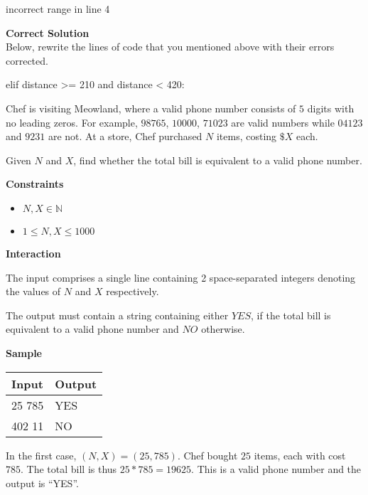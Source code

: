 \documentclass[a4paper]{exam}
\newcommand\heading[1]{\textbf{#1}}
\begin{document}
\begin{questions}
    \begin{mdframed}
    incorrect range in line 4
    \end{mdframed}

  
    \heading{Correct Solution}\\
    Below, rewrite the lines of code that you mentioned above with their errors corrected.
    
\begin{python}[numbers=none]
elif distance >= 210 and distance < 420:
\end{python}
    

    Chef is visiting Meowland, where a valid phone number consists of $5$ digits with no leading zeros. For example, $98765$, $10000$, $71023$ are valid numbers while $04123$ and $9231$ are not. At a store, Chef purchased $N$ items, costing $\$X$ each.

    Given $N$ and $X$, find whether the total bill is equivalent to a valid phone number.

    \heading{Constraints}
    \begin{itemize}
        \item $N,X \in \mathbb{N}$
        \item $1 \le N,X \le 1000$
    \end{itemize}

    \heading{Interaction}

    The input comprises a single line containing 2 space-separated integers denoting the values of $N$ and $X$ respectively.

    The output must contain a string containing either $YES$, if the total bill is equivalent to a valid phone number and $NO$ otherwise.

    \heading{Sample}

    \begin{tabularx}{\textwidth}{|X|X|}
        \rowcolor{gray!50}
        \hline
        Input  & Output \\ \hline\hline
        25 785 & YES    \\\hline
        402 11 & NO     \\\hline
    \end{tabularx}

    In the first case, $(N,X)=(25,785)$. Chef bought $25$ items, each with cost $785$. The total bill is thus $25 * 785 = 19625$. This is a valid phone number and the output is ``YES''.


\end{questions}
\end{document}
